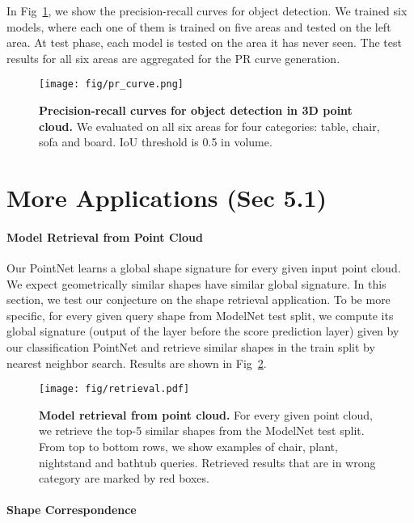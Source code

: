\documentclass[10pt,twocolumn,letterpaper]{article}
\begin{document}
 In Fig~\ref{fig:pr_curve}, we show the precision-recall curves for object detection. We trained six models, where each one of them is trained on five areas and tested on the left area. At test phase, each model is tested on the area it has never seen. The test results for all six areas are aggregated for the PR curve generation.
 
 \begin{figure}
 \texttt{[image: fig/pr\_curve.png]}
 \centering
 \caption{\textbf{Precision-recall curves for object detection in 3D point cloud.} We evaluated on all six areas for four categories: table, chair, sofa and board. IoU threshold is 0.5 in volume.}
 \label{fig:pr_curve}
 \end{figure}
 
\section{More Applications (Sec 5.1)}
\label{sec:supp_application}
\paragraph{Model Retrieval from Point Cloud} Our PointNet learns a global shape signature for every given input point cloud. We expect geometrically similar shapes have similar global signature. In this section, we test our conjecture on the shape retrieval application. To be more specific, for every given query shape from ModelNet test split, we compute its global signature (output of the layer before the score prediction layer) given by our classification PointNet and retrieve similar shapes in the train split by nearest neighbor search. Results are shown in Fig~\ref{fig:retrieval}.

\begin{figure}[h]
    \centering
    \texttt{[image: fig/retrieval.pdf]}
    \caption{\textbf{Model retrieval from point cloud.} For every given point cloud, we retrieve the top-5 similar shapes from the ModelNet test split. From top to bottom rows, we show examples of chair, plant, nightstand and bathtub queries. Retrieved results that are in wrong category are marked by red boxes.}
    \label{fig:retrieval}
\end{figure}

\paragraph{Shape Correspondence}
\end{document}
